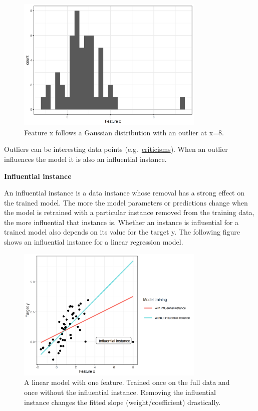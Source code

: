 \documentclass[
  11pt,
]{scrbook}
\begin{document}
\begin{figure}

{\centering \includegraphics[width=0.8\textwidth]{images/outlier-1} 

}

\caption{Feature x follows a Gaussian distribution with an outlier at x=8.}\label{fig:outlier}
\end{figure}

Outliers can be interesting data points (e.g.~\protect\hyperlink{proto}{criticisms}).
When an outlier influences the model it is also an influential instance.

\textbf{Influential instance}

An influential instance is a data instance whose removal has a strong effect on the trained model.
The more the model parameters or predictions change when the model is retrained with a particular instance removed from the training data, the more influential that instance is. Whether an instance is influential for a trained model also depends on its value for the target y.
The following figure shows an influential instance for a linear regression model.

\begin{figure}

{\centering \includegraphics[width=0.8\textwidth]{images/influential-point-1} 

}

\caption{A linear model with one feature. Trained once on the full data and once without the influential instance. Removing the influential instance changes the fitted slope (weight/coefficient) drastically.}\label{fig:influential-point}
\end{figure}
\end{document}
